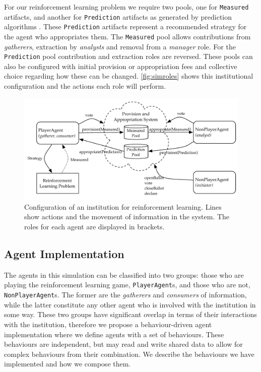 For our reinforcement learning problem we require two pools, one for
\texttt{Measured} artifacts, and another for \texttt{Prediction} artifacts as generated by prediction algorithms
. These \texttt{Prediction} artifacts represent a recommended strategy for the agent who appropriates them.
The \texttt{Measured} pool allows contributions from \emph{gatherers}, extraction
by \emph{analysts} and removal from a \emph{manager} role. For the \texttt{Prediction} pool
contribution and extraction roles are reversed.  
These pools can also be
configured with initial provision or appropriation fees and collective choice
regarding how these can be changed. \autoref{fig:simroles} shows this institutional configuration and the actions each role will perform.

\begin{figure}
\centering
\includegraphics[width=\textwidth]{gfx/simulation_roles}
\caption[Configuration of an institution for reinforcement learning.]{Configuration of an institution for reinforcement learning. Lines show actions and the movement of information in the system. The roles for each agent are displayed in brackets.}\label{fig:simroles}
\end{figure}

\subsection{Agent Implementation}

The agents in this simulation can be classified into two groups: those who are
playing the reinforcement learning game, \texttt{PlayerAgent}s, and those who
are not, \texttt{NonPlayerAgent}s. The former are the \emph{gatherers} and
\emph{consumers} of information, while the latter constitute any other agent
who is involved with the institution in some way. These two groups have
significant overlap in terms of their interactions with the institution,
therefore we propose a behaviour-driven agent implementation where we define
agents with a set of behaviours. These behaviours are independent, but may
read and write shared data to allow for complex behaviours from their
combination. We describe the behaviours we have implemented and how we compose
them.

